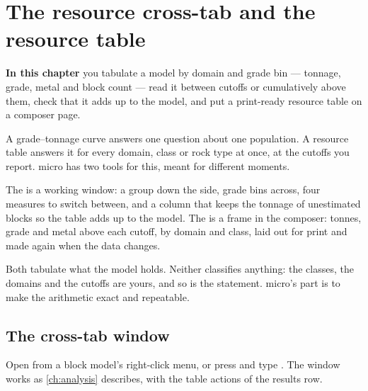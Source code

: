 \chapter{The resource cross-tab and the resource table}\label{ch:resources}
\begin{goals}
\textbf{In this chapter} you tabulate a model by domain and grade bin — tonnage, grade, metal and block count — read it between cutoffs or cumulatively above them, check that it adds up to the model, and put a print-ready resource table on a composer page.
\end{goals}

A grade–tonnage curve answers one question about one population. A resource table answers it for every domain, class or rock type at once, at the cutoffs you report. micro has two tools for this, meant for different moments.

The  is a working window: a group down the side, grade bins across, four measures to switch between, and a column that keeps the tonnage of unestimated blocks so the table adds up to the model. The  is a frame in the composer: tonnes, grade and metal above each cutoff, by domain and class, laid out for print and made again when the data changes.

\begin{note}
Both tabulate what the model holds. Neither classifies anything: the classes, the domains and the cutoffs are yours, and so is the statement. micro's part is to make the arithmetic exact and repeatable.
\end{note}

\section{The cross-tab window}\label{sec:xtab-window}
Open  from a block model's right-click menu, or press  and type . The window works as \cref{ch:analysis} describes, with the table actions of the results row.

